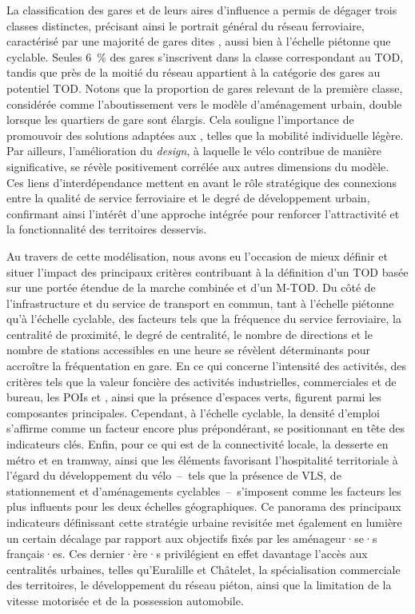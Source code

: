 \begin{refsegment}
La classification des gares et de leurs aires d'influence a permis de dégager trois classes distinctes, précisant ainsi le portrait général du réseau ferroviaire, caractérisé par une majorité de gares dites , aussi bien à l’échelle piétonne que cyclable. Seules 6~\% des gares s’inscrivent dans la classe correspondant au \acrshort{TOD}, tandis que près de la moitié du réseau appartient à la catégorie des gares au potentiel \acrshort{TOD}. Notons que la proportion de gares relevant de la première classe, considérée comme l’aboutissement vers le modèle d’aménagement urbain, double lorsque les quartiers de gare sont élargis. Cela souligne l’importance de promouvoir des solutions adaptées aux , telles que la mobilité individuelle légère. Par ailleurs, l’amélioration du \textsl{design}, à laquelle le vélo contribue de manière significative, se révèle positivement corrélée aux autres dimensions du modèle. Ces liens d'interdépendance mettent en avant le rôle stratégique des connexions entre la qualité de service ferroviaire et le degré de développement urbain, confirmant ainsi l’intérêt d’une approche intégrée pour renforcer l’attractivité et la fonctionnalité des territoires desservis.%

Au travers de cette modélisation, nous avons eu l'occasion de mieux définir et situer l’impact des principaux critères contribuant à la définition d’un \acrshort{TOD} basée sur une portée étendue de la marche combinée et d’un \acrshort{M-TOD}. Du côté de l’infrastructure et du service de transport en commun, tant à l’échelle piétonne qu’à l’échelle cyclable, des facteurs tels que la fréquence du service ferroviaire, la centralité de proximité, le degré de centralité, le nombre de directions et le nombre de stations accessibles en une heure se révèlent déterminants pour accroître la fréquentation en gare. En ce qui concerne l’intensité des activités, des critères tels que la valeur foncière des activités industrielles, commerciales et de bureau, les \acrshort{POIs}  et , ainsi que la présence d’espaces verts, figurent parmi les composantes principales. Cependant, à l’échelle cyclable, la densité d’emploi s’affirme comme un facteur encore plus prépondérant, se positionnant en tête des indicateurs clés. Enfin, pour ce qui est de la connectivité locale, la desserte en métro et en tramway, ainsi que les éléments favorisant l’hospitalité territoriale à l’égard du développement du vélo~–~tels que la présence de \acrshort{VLS}, de stationnement et d'aménagements cyclables~–~s’imposent comme les facteurs les plus influents pour les deux échelles géographiques. Ce panorama des principaux indicateurs définissant cette stratégie urbaine revisitée met également en lumière un certain décalage par rapport aux objectifs fixés par les aménageur·se·s français·es. Ces dernier·ère·s privilégient en effet davantage l’accès aux centralités urbaines, telles qu’Euralille et Châtelet, la spécialisation commerciale des territoires, le développement du réseau piéton, ainsi que la limitation de la vitesse motorisée et de la possession automobile.%


\end{refsegment}
